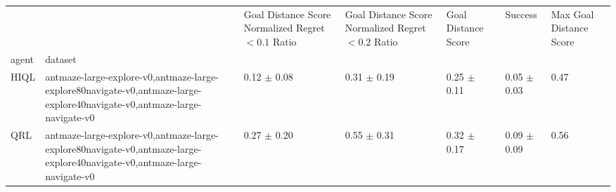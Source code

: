 \begin{tabular}{lllllll}
\toprule
 &  & Goal Distance Score Normalized Regret $< 0.1$ Ratio & Goal Distance Score Normalized Regret $< 0.2$ Ratio & Goal Distance Score & Success & Max Goal Distance Score \\
agent & dataset &  &  &  &  &  \\
\midrule
HIQL & antmaze-large-explore-v0,antmaze-large-explore80navigate-v0,antmaze-large-explore40navigate-v0,antmaze-large-navigate-v0 & 0.12 $\pm$ 0.08 & 0.31 $\pm$ 0.19 & 0.25 $\pm$ 0.11 & 0.05 $\pm$ 0.03 & 0.47 \\
\cline{1-7}
QRL & antmaze-large-explore-v0,antmaze-large-explore80navigate-v0,antmaze-large-explore40navigate-v0,antmaze-large-navigate-v0 & 0.27 $\pm$ 0.20 & 0.55 $\pm$ 0.31 & 0.32 $\pm$ 0.17 & 0.09 $\pm$ 0.09 & 0.56 \\
\cline{1-7}
\bottomrule
\end{tabular}
